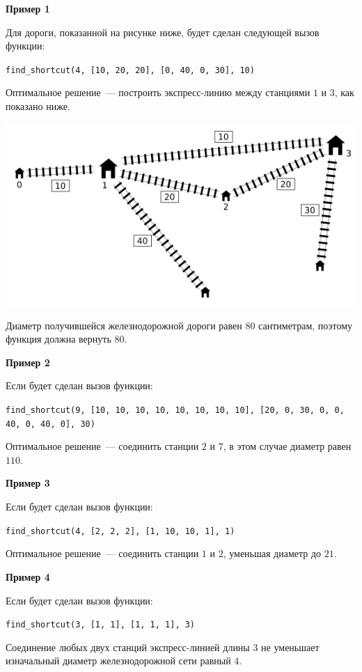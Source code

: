 \textbf{Пример 1}

Для дороги, показанной на рисунке ниже, будет сделан следующей вызов функции:

\texttt{find\_shortcut(4, [10, 20, 20], [0, 40, 0, 30], 10)}

Оптимальное решение~--- построить экспресс-линию между станциями $1$ и $3$, как показано ниже.

\includegraphics[scale=0.9]{2.png}

Диаметр получившейся железнодорожной дороги равен $80$ сантиметрам, поэтому функция должна вернуть $80$.

\textbf{Пример 2}

Если будет сделан вызов функции:

\texttt{find\_shortcut(9, [10, 10, 10, 10, 10, 10, 10, 10], [20, 0, 30, 0, 0, 40, 0, 40, 0], 30)}

Оптимальное решение~--- соединить станции $2$ и $7$, в этом случае диаметр
равен $110$.

\textbf{Пример 3}

Если будет сделан вызов функции:

\texttt{find\_shortcut(4, [2, 2, 2], [1, 10, 10, 1], 1) }

Оптимальное решение~--- соединить станции $1$ и $2$, уменьшая диаметр до $21$.

\textbf{Пример 4}

Если будет сделан вызов функции:

\texttt{find\_shortcut(3, [1, 1], [1, 1, 1], 3)}

Соединение любых двух станций экспресс-линией длины $3$ не уменьшает
изначальный диаметр железнодорожной сети равный $4$.
